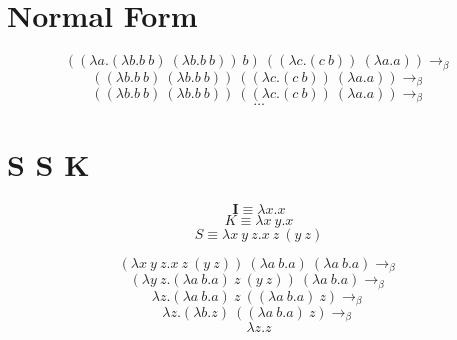 \documentclass{article}
\begin{document}
\section{Normal Form}
\large{$$((\lambda a.(\lambda b.b\ b)\ (\lambda b.b\ b))\ b)\ ((\lambda c.(c\ b))\ (\lambda a.a))\rightarrow_\beta$$}
\large{$$((\lambda b.b\ b)\ (\lambda b.b\ b))\ ((\lambda c.(c\ b))\ (\lambda a.a))\rightarrow_\beta$$}
\large{$$((\lambda b.b\ b)\ (\lambda b.b\ b))\ ((\lambda c.(c\ b))\ (\lambda a.a))\rightarrow_\beta$$}
$$\hdots$$

\section{S S K}
$$\textbf{I} \equiv \lambda x.x$$
$$K \equiv \lambda x\ y.x$$
$$S \equiv \lambda x\ y\ z. x\ z\ (y\ z)$$

\large{$$(\lambda x\ y\ z. x\ z\ (y\ z))\ (\lambda a\ b.a)\ (\lambda a\ b.a)\rightarrow_\beta$$}
\large{$$(\lambda y\ z. (\lambda a\ b.a)\ z\ (y\ z))\ (\lambda a\ b.a)\rightarrow_\beta$$}
\large{$$\lambda z. (\lambda a\ b.a)\ z\ ((\lambda a\ b.a)\ z)\rightarrow_\beta$$}
\large{$$\lambda z. (\lambda b.z)\ ((\lambda a\ b.a)\ z)\rightarrow_\beta$$}
\large{$$\lambda z. z$$}
\end{document}
